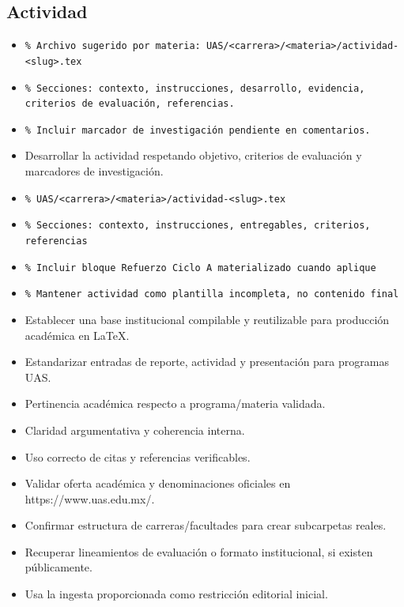 \documentclass[12pt]{article}
\begin{document}
\subsection*{Actividad}
\begin{itemize}[leftmargin=*]
  \item \texttt{\% Archivo sugerido por materia: UAS/<carrera>/<materia>/actividad-<slug>.tex}
  \item \texttt{\% Secciones: contexto, instrucciones, desarrollo, evidencia, criterios de evaluación, referencias.}
  \item \texttt{\% Incluir marcador de investigación pendiente en comentarios.}
  \item Desarrollar la actividad respetando objetivo, criterios de evaluación y marcadores de investigación.
  \item \texttt{\% UAS/<carrera>/<materia>/actividad-<slug>.tex}
  \item \texttt{\% Secciones: contexto, instrucciones, entregables, criterios, referencias}
  \item \texttt{\% Incluir bloque Refuerzo Ciclo A materializado cuando aplique}
  \item \texttt{\% Mantener actividad como plantilla incompleta, no contenido final}
  \item Establecer una base institucional compilable y reutilizable para producción académica en LaTeX.
  \item Estandarizar entradas de reporte, actividad y presentación para programas UAS.
  \item Pertinencia académica respecto a programa/materia validada.
  \item Claridad argumentativa y coherencia interna.
  \item Uso correcto de citas y referencias verificables.
  \item Validar oferta académica y denominaciones oficiales en https://www.uas.edu.mx/.
  \item Confirmar estructura de carreras/facultades para crear subcarpetas reales.
  \item Recuperar lineamientos de evaluación o formato institucional, si existen públicamente.
  \item Usa la ingesta proporcionada como restricción editorial inicial.
\end{itemize}
\end{document}

